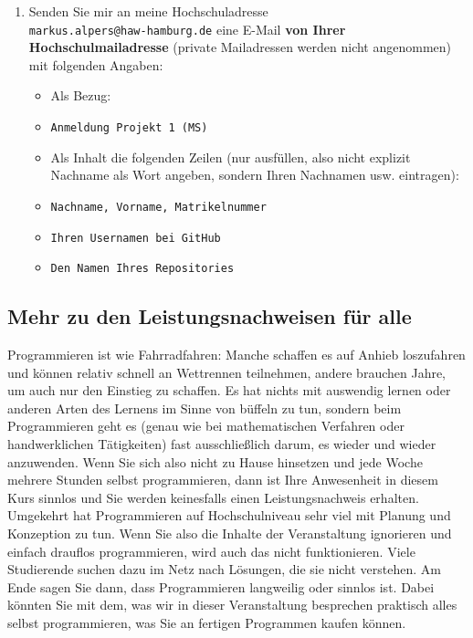 \begin{enumerate}
	\item Senden Sie mir an meine Hochschuladresse\\ \verb|markus.alpers@haw-hamburg.de| eine E-Mail \textbf{von Ihrer Hochschulmailadresse} (private Mailadressen werden nicht angenommen) mit folgenden Angaben:
	\begin{itemize}
		\item Als Bezug: 
		\item \verb|Anmeldung Projekt 1 (MS)|
		\item Als Inhalt die folgenden Zeilen (nur ausfüllen, also nicht explizit Nachname als Wort angeben, sondern Ihren Nachnamen usw. eintragen):
		\item \verb|Nachname, Vorname, Matrikelnummer|
		\item \verb|Ihren Usernamen bei GitHub|
		\item \verb|Den Namen Ihres Repositories|
	\end{itemize}
\end{enumerate}

\subsection{Mehr zu den Leistungsnachweisen für alle}

Programmieren ist wie Fahrradfahren: Manche schaffen es auf Anhieb loszufahren und können relativ schnell an Wettrennen teilnehmen, andere brauchen Jahre, um auch nur den Einstieg zu schaffen. Es hat nichts mit auswendig lernen oder anderen Arten des \glqq{}Lernens\grqq{} im Sinne von \glqq{}büffeln\grqq{} zu tun, sondern beim Programmieren geht es (genau wie bei mathematischen Verfahren oder handwerklichen Tätigkeiten) fast ausschließlich darum, es wieder und wieder anzuwenden. Wenn Sie sich also nicht zu Hause hinsetzen und jede Woche mehrere Stunden selbst programmieren, dann ist Ihre Anwesenheit in diesem Kurs sinnlos und Sie werden keinesfalls einen Leistungsnachweis erhalten.\\

Umgekehrt hat Programmieren auf Hochschulniveau sehr viel mit Planung und Konzeption zu tun. Wenn Sie also die Inhalte der Veranstaltung ignorieren und einfach drauflos programmieren, wird auch das nicht funktionieren. Viele Studierende suchen dazu im Netz nach Lösungen, die sie nicht verstehen. Am Ende sagen Sie dann, dass Programmieren langweilig oder sinnlos ist. Dabei könnten Sie mit dem, was wir in dieser Veranstaltung besprechen praktisch alles selbst programmieren, was Sie an fertigen Programmen kaufen können.

